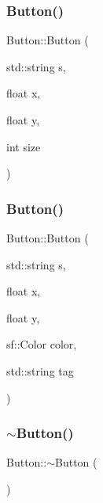 \mbox{\label{class_button_a5cb3870eebc02523605b4ed4c1f8fbca}} 
\subsubsection{\texorpdfstring{Button()}{Button()}\hspace{0.1cm}{\footnotesize\ttfamily [2/3]}}
{\footnotesize\ttfamily Button\+::\+Button (\begin{DoxyParamCaption}\item[{std\+::string}]{s,  }\item[{float}]{x,  }\item[{float}]{y,  }\item[{int}]{size }\end{DoxyParamCaption})}

\mbox{\label{class_button_a6213f9c96a0bc254c433702c67fea2ca}} 
\subsubsection{\texorpdfstring{Button()}{Button()}\hspace{0.1cm}{\footnotesize\ttfamily [3/3]}}
{\footnotesize\ttfamily Button\+::\+Button (\begin{DoxyParamCaption}\item[{std\+::string}]{s,  }\item[{float}]{x,  }\item[{float}]{y,  }\item[{sf\+::\+Color}]{color,  }\item[{std\+::string}]{tag }\end{DoxyParamCaption})}

\mbox{\label{class_button_a2a001eb9c3cc8ae54768a850dd345002}} 
\subsubsection{\texorpdfstring{$\sim$Button()}{~Button()}}
{\footnotesize\ttfamily Button\+::$\sim$\+Button (\begin{DoxyParamCaption}{ }\end{DoxyParamCaption})}



